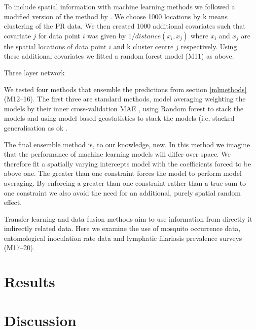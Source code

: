 \documentclass{bmcart}
\begin{document}

To include spatial information with machine learning methods we followed a modified version of the method by \cite{}.
We choose 1000 locations by k means clustering of the PR data.
We then created 1000 additional covariates such that covariate $j$ for data point $i$ was given by $1 / distance (x_i, x_j)$ where $x_i$ and $x_j$ are the spatial locations of data point $i$ and k cluster centre $j$ respectively.
Using these additional covariates we fitted a random forest model (M11) as above.



Three layer network



We tested four methods that ensemble the predictions from section \ref{mlmethods} (M12--16).
The first three are standard methods, model averaging weighting the models by their inner cross-validation MAE \cite{}, using Random forest to stack the models \cite{} and using model based geostatistics to stack the models (i.e. stacked generalisation as ok \cite{bhatt2017improved}.

The final ensemble method is, to our knowledge, new.
In this method we imagine that the performance of machine learning models will differ over space.
We therefore fit a spatially varying intercepts model with the coefficients forced to be above one.
The greater than one constraint forces the model to perform model averaging.
By enforcing a greater than one constraint rather than a true sum to one constraint we also avoid the need for an additional, purely spatial random effect.



Transfer learning and data fusion methods aim to use information from directly it indirectly related data.
Here we examine the use of mosquito occurrence data, entomological inoculation rate data and lymphatic filariasis prevalence surveys (M17--20).



\section*{Results}

\section*{Discussion}






\end{document}
